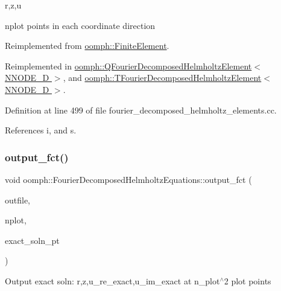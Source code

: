 r,z,u

nplot points in each coordinate direction 

Reimplemented from \hyperlink{classoomph_1_1FiniteElement_adfaee690bb0608f03320eeb9d110d48c}{oomph\+::\+Finite\+Element}.



Reimplemented in \hyperlink{classoomph_1_1QFourierDecomposedHelmholtzElement_a846e28bf8f1bae1ace68b0b291688841}{oomph\+::\+Q\+Fourier\+Decomposed\+Helmholtz\+Element$<$ N\+N\+O\+D\+E\+\_\+D $>$}, and \hyperlink{classoomph_1_1TFourierDecomposedHelmholtzElement_a6d354eaf73ecef7a77db246e728a7ed1}{oomph\+::\+T\+Fourier\+Decomposed\+Helmholtz\+Element$<$ N\+N\+O\+D\+E\+\_\+D $>$}.



Definition at line 499 of file fourier\+\_\+decomposed\+\_\+helmholtz\+\_\+elements.\+cc.



References i, and s.

\mbox{\label{classoomph_1_1FourierDecomposedHelmholtzEquations_a9024cd81a80a4709b127560b6f15cd43}} 
\subsubsection{\texorpdfstring{output\+\_\+fct()}{output\_fct()}\hspace{0.1cm}{\footnotesize\ttfamily [1/2]}}
{\footnotesize\ttfamily void oomph\+::\+Fourier\+Decomposed\+Helmholtz\+Equations\+::output\+\_\+fct (\begin{DoxyParamCaption}\item[{std\+::ostream \&}]{outfile,  }\item[{const unsigned \&}]{nplot,  }\item[{\hyperlink{classoomph_1_1FiniteElement_a690fd33af26cc3e84f39bba6d5a85202}{Finite\+Element\+::\+Steady\+Exact\+Solution\+Fct\+Pt}}]{exact\+\_\+soln\+\_\+pt }\end{DoxyParamCaption})\hspace{0.3cm}{\ttfamily [virtual]}}

Output exact soln\+: r,z,u\+\_\+re\+\_\+exact,u\+\_\+im\+\_\+exact at n\+\_\+plot$^\wedge$2 plot points

